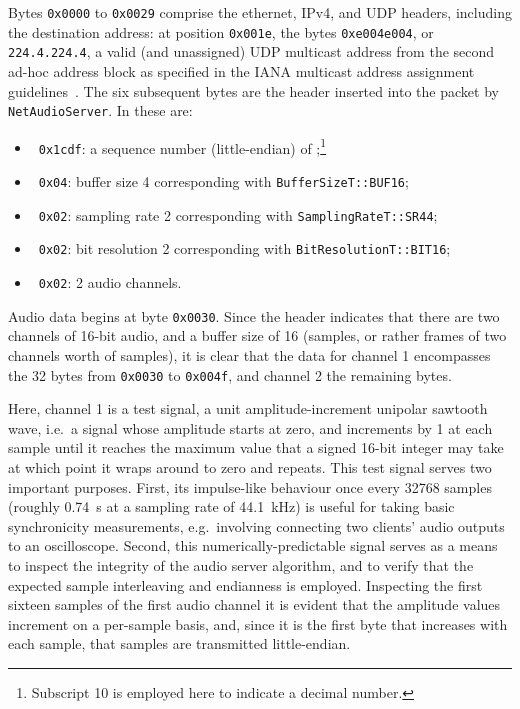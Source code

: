 Bytes \texttt{0x0000} to \texttt{0x0029} comprise the ethernet, IPv4, and UDP
headers, including the destination address: at position \texttt{0x001e}, the
bytes \texttt{0xe004e004}, or \texttt{224.4.224.4}, a valid (and unassigned)
UDP multicast address from the second ad-hoc address block as specified in the
IANA multicast address assignment guidelines~\citep{meyer_iana_2010}.
The six subsequent bytes are the header inserted into the packet by
\texttt{NetAudioServer}.
In  these are:
\begin{itemize}
    \item~\texttt{0x1cdf}: a sequence number (little-endian) of
    ;\footnote{Subscript 10 is employed here to indicate a decimal
    number.}
    \item~\texttt{0x04}: buffer size \num{4} corresponding with
    \texttt{BufferSizeT::BUF16};
    \item~\texttt{0x02}: sampling rate \num{2} corresponding with
    \texttt{SamplingRateT::SR44};
    \item~\texttt{0x02}: bit resolution \num{2} corresponding with
    \texttt{BitResolutionT::BIT16};
    \item~\texttt{0x02}: \num{2} audio channels.
\end{itemize}

Audio data begins at byte \texttt{0x0030}.
Since the header indicates that there are two channels of 16-bit audio, and a
buffer size of 16 (samples, or rather frames of two channels worth of samples),
it is clear that the data for channel 1 encompasses the 32 bytes from
\texttt{0x0030} to \texttt{0x004f}, and channel 2 the remaining bytes.

Here, channel 1 is a test signal, a unit amplitude-increment unipolar sawtooth
wave, i.e.\ a signal whose amplitude starts at zero, and increments by 1 at each
sample until it reaches the maximum value that a signed 16-bit integer may take
\textemdash{}  \textemdash{} at which point it wraps around to
zero and repeats.
This test signal serves two important purposes.
First, its impulse-like behaviour once every \num{32768} samples (roughly
\qty{.74}{\s} at a sampling rate of \qty{44.1}{\kHz}) is useful for taking basic
synchronicity measurements, e.g.\ involving connecting two clients' audio
outputs to an oscilloscope.
Second, this numerically-predictable signal serves as a means to inspect the
integrity of the audio server algorithm, and to verify that the expected
sample interleaving and endianness is employed.
Inspecting the first sixteen samples of the first audio channel
it is evident that the amplitude values increment on a per-sample basis, and,
since it is the first byte that increases with each sample, that samples are
transmitted little-endian.

